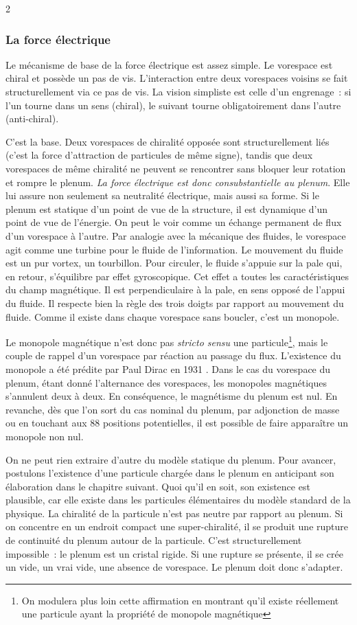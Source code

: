 \begin{multicols}{2}
\subsubsection{La force électrique}

Le mécanisme de base de la force électrique est assez simple. Le
vorespace est chiral et possède un pas de vis. L'interaction entre
deux vorespaces voisins se fait structurellement via ce pas de vis. La
vision simpliste est celle d'un engrenage : si l'un tourne dans un
sens (chiral), le suivant tourne obligatoirement dans l'autre
(anti-chiral).

C'est la base. Deux vorespaces de chiralité opposée sont
structurellement liés (c'est la force d'attraction de particules de
même signe), tandis que deux vorespaces de même chiralité ne peuvent
se rencontrer sans bloquer leur rotation et rompre le plenum.
\textit{La force électrique est donc consubstantielle au plenum}. Elle lui
assure non seulement sa neutralité électrique, mais aussi sa forme.
Si le plenum est statique d'un point de vue de la structure, il est
dynamique d'un point de vue de l'énergie. On peut le voir comme un
échange permanent de flux d'un vorespace à l'autre. Par analogie avec
la mécanique des fluides, le vorespace agit comme une turbine pour le
fluide de l'information. Le mouvement du fluide est un pur
vortex, un tourbillon. Pour circuler, le fluide s'appuie sur la pale 
qui, en retour, s'équilibre par effet gyroscopique. Cet effet a toutes
les caractéristiques du champ magnétique. Il est perpendiculaire à la
pale, en sens opposé de l'appui du fluide. Il respecte bien la règle
des trois doigts par rapport au mouvement du fluide. Comme il existe
dans chaque vorespace sans boucler, c'est un monopole.

Le monopole magnétique n'est donc pas \textit{stricto sensu} une particule\footnote{On modulera plus loin cette affirmation en montrant qu'il existe réellement une particule ayant la propriété de monopole magnétique},
mais le couple de rappel d'un vorespace par réaction au passage du
flux. L'existence du monopole a été prédite par Paul Dirac en 1931 \cite{dirac1931quantised}.
Dans le cas du vorespace du plenum, étant donné l'alternance des vorespaces, les monopoles magnétiques s'annulent deux à deux. En conséquence, le magnétisme du plenum est nul.
En revanche, dès que l'on sort du cas nominal du plenum, par
adjonction de masse ou en touchant aux 88 positions potentielles, il est possible de faire apparaître
un monopole non nul.

On ne peut rien extraire d'autre du modèle statique du plenum.
Pour avancer, postulons l'existence d'une particule chargée
dans le plenum en anticipant son élaboration dans le chapitre suivant.
Quoi qu'il en soit, son existence est plausible, car elle existe dans
les particules élémentaires du modèle standard de la physique.
La chiralité de la particule n'est pas neutre par rapport au plenum.
Si on concentre en un endroit compact une super-chiralité, il se
produit une rupture de continuité du plenum autour de la particule.
C'est structurellement impossible : le plenum est un cristal rigide.
Si une rupture se présente, il se crée un vide, un vrai vide, une
absence de vorespace. Le plenum doit donc s'adapter.


\end{multicols}
